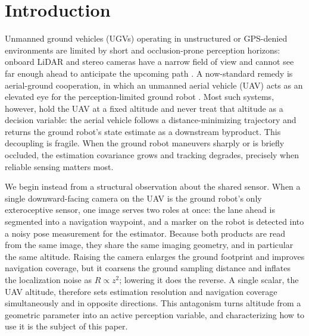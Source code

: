 \documentclass{ifacconf}
\newcommand\blfootnote[1]{\begingroup\renewcommand\thefootnote{}\footnotetext{#1}\endgroup}
\begin{document}
\section{Introduction}
\label{sec:intro}
\blfootnote{$^{\dagger}$~denotes equal contribution.}

Unmanned ground vehicles (UGVs) operating in unstructured or GPS-denied environments are limited by short
and occlusion-prone perception horizons: onboard LiDAR and stereo cameras have a narrow field of view and
cannot see far enough ahead to anticipate the upcoming path \citep{frey2024roadrunner}.
A now-standard remedy is aerial-ground cooperation, in which an unmanned aerial vehicle (UAV) acts as an
elevated eye for the perception-limited ground robot \citep{grocholsky2006cooperative,li2024colag,santos2024aerial}.
Most such systems, however, hold the UAV at a fixed altitude and never treat that altitude as a decision
variable: the aerial vehicle follows a distance-minimizing trajectory and returns the ground robot's state
estimate as a downstream byproduct. This decoupling is fragile. When the ground robot maneuvers sharply
or is briefly occluded, the estimation covariance grows and tracking degrades, precisely when reliable
sensing matters most.

We begin instead from a structural observation about the shared sensor. When a single downward-facing
camera on the UAV is the ground robot's only exteroceptive sensor, one image serves two roles at once: the
lane ahead is segmented into a navigation waypoint, and a marker on the robot is detected into a noisy pose
measurement for the estimator. Because both products are read from the same image, they share the same
imaging geometry, and in particular the same altitude. Raising the camera enlarges the ground footprint and
improves navigation coverage, but it coarsens the ground sampling distance and inflates the localization
noise as $R\propto z^2$; lowering it does the reverse. A single scalar, the UAV altitude, therefore sets
estimation resolution and navigation coverage simultaneously and in opposite directions. This antagonism
turns altitude from a geometric parameter into an active perception variable, and characterizing how to use
it is the subject of this paper.
\end{document}
